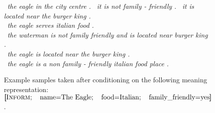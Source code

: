 \begin{figure}[t]
\textit{\starttok~the eagle in the city centre . \senttok~it is not family - friendly . \senttok~it is located near the burger king . \stoptok}\\
\textit{\starttok~the eagle serves italian food . \stoptok}\\
\textit{\starttok~the waterman is not family friendly and is located near burger king . \stoptok}\\
\textit{\starttok~the eagle is located near the burger king . \stoptok}\\
\textit{\starttok~the eagle is a non family - friendly italian food place . \stoptok}\\
\caption{Example samples taken after conditioning on the following  meaning representation: 
$\left[\!\!\left[\textsc{Inform};\quad    \textrm{name=The Eagle};\quad \textrm{food=Italian};\quad \textrm{family\_friendly=yes}\right]\!\!\right]$. }
\label{fig:examplesamples}
\end{figure}
